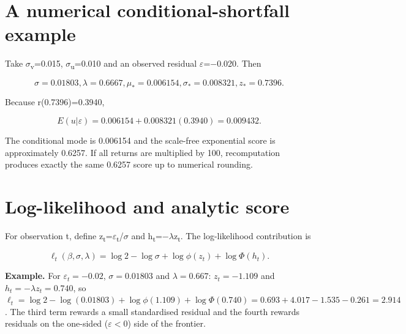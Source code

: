 \hypertarget{a-numerical-conditional-shortfall-example}{%
\section{A numerical conditional-shortfall
example}\label{a-numerical-conditional-shortfall-example}}

Take \ensuremath{\sigma }\textsubscript{v}=0.015, \ensuremath{\sigma }\textsubscript{u}=0.010 and an observed
residual \ensuremath{\varepsilon }=\ensuremath{-}0.020. Then

\begin{equation}
\sigma =0.01803, \lambda =0.6667, \mu _{*}=0.006154, \sigma _{*}=0.008321, z_{*}=0.7396.
\end{equation}

Because r(0.7396)=0.3940,

\begin{equation}
E(u|\varepsilon )=0.006154+0.008321(0.3940)=0.009432.
\end{equation}

The conditional mode is 0.006154 and the scale-free exponential score is
approximately 0.6257. If all returns are multiplied by 100,
recomputation produces exactly the same 0.6257 score up to numerical
rounding.

\hypertarget{log-likelihood-and-analytic-score}{%
\section{Log-likelihood and analytic
score}\label{log-likelihood-and-analytic-score}}

For observation t, define z\textsubscript{t}=\ensuremath{\varepsilon }\textsubscript{t}/\ensuremath{\sigma } and
h\textsubscript{t}=\ensuremath{-}\ensuremath{\lambda }z\textsubscript{t}. The log-likelihood contribution
is

\begin{equation}\label{eq:ch14-loglik}
\ell _{t}(\beta ,\sigma ,\lambda )=\log 2-\log \sigma +\log \phi (z_{t})+\log \Phi (h_{t}).
\end{equation}

\textbf{Example.} For $\varepsilon_t=-0.02$, $\sigma=0.01803$ and
$\lambda=0.667$: $z_t=-1.109$ and $h_t=-\lambda z_t=0.740$, so
$\ell_t=\log2-\log(0.01803)+\log\phi(1.109)+\log\Phi(0.740)
=0.693+4.017-1.535-0.261=2.914$. The third term rewards a small
standardised residual and the fourth rewards residuals on the
one-sided ($\varepsilon<0$) side of the frontier.

